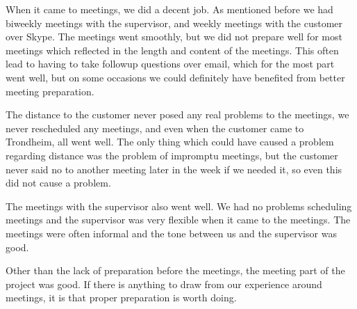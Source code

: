 When it came to meetings, we did a decent job. As mentioned before we had biweekly meetings with the supervisor, and weekly meetings with the customer over Skype. The meetings went smoothly, but we did not prepare well for most meetings which reflected in the length and content of the meetings. This often lead to having to take followup questions over email, which for the most part went well, but on some occasions we could definitely have benefited from better meeting preparation.

The distance to the customer never posed any real problems to the meetings, we never rescheduled any meetings, and even when the customer came to Trondheim, all went well. The only thing which could have caused a problem regarding distance was the problem of impromptu meetings, but the customer never said no to another meeting later in the week if we needed it, so even this did not cause a problem. 

The meetings with the supervisor also went well. We had no problems scheduling meetings and the supervisor was very flexible when it came to the meetings. The meetings were often informal and the tone between us and the supervisor was good.

Other than the lack of preparation before the meetings, the meeting part of the project was good. If there is anything to draw from our experience around meetings, it is that proper preparation is worth doing.
